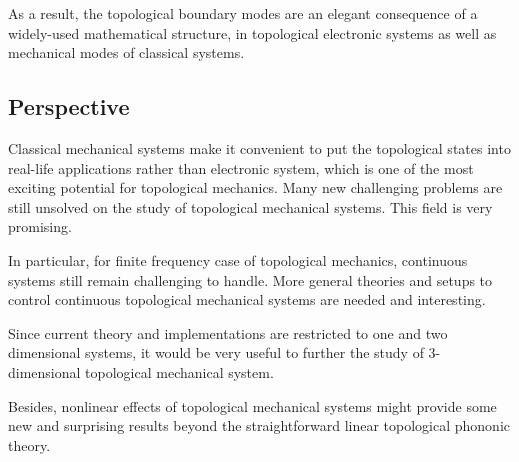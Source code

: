 \documentclass[aps,pre,preprint,groupedaddress]{revtex4-1}
\begin{document}
As a result, the topological boundary modes are an elegant consequence of a widely-used mathematical structure, in topological electronic systems as well as mechanical modes of classical systems.

\subsection{Perspective}

Classical mechanical systems make it convenient to put the topological states into real-life applications rather than electronic system, which is one of the most exciting potential for topological mechanics. Many new challenging problems are still unsolved on the study of topological mechanical systems. This field is very promising.

In particular, for finite frequency case of topological mechanics, continuous systems still remain challenging to handle. More general theories and setups to control continuous topological mechanical systems are needed and interesting.

Since current theory and implementations are restricted to one and two dimensional systems, it would be very useful to further the study of 3-dimensional topological mechanical system.

Besides, nonlinear effects of topological mechanical systems might provide some new and surprising results beyond the straightforward linear topological phononic theory.


%

\end{document}
